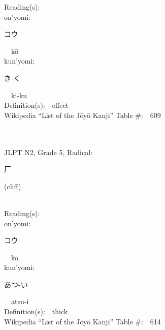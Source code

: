 \begin{multicols}{2}
Reading(s):\ \ \\
{\hspace*{1em}}on'yomi:\ \ \\
{\hspace*{2em}}{\begin{CJK}{UTF8}{min} コウ \end{CJK}}\ \ k\=o\ \ \\
{\hspace*{1em}}kun'yomi:\ \ \\
{\hspace*{2em}}{\begin{CJK}{UTF8}{min} き-く \end{CJK}}\ \ ki-ku\ \ \\
Definition(s):\ \ effect \\
Wikipedia ``List of the J\=oy\=o Kanji'' Table \#:\ \ 609 \\
\ \ \\
{\fontsize{34pt}{40pt}  }\ \ \\  %
{JLPT N2, Grade 5, Radical:\ \ {\begin{CJK}{UTF8}{min} 厂 \end{CJK}} (cliff) } \\
Reading(s):\ \ \\
{\hspace*{1em}}on'yomi:\ \ \\
{\hspace*{2em}}{\begin{CJK}{UTF8}{min} コウ \end{CJK}}\ \ k\=o\ \ \\
{\hspace*{1em}}kun'yomi:\ \ \\
{\hspace*{2em}}{\begin{CJK}{UTF8}{min} あつ-い \end{CJK}}\ \ atsu-i\ \ \\
Definition(s):\ \ thick \\
Wikipedia ``List of the J\=oy\=o Kanji'' Table \#:\ \ 614 \\
\ \ \\
{\fontsize{34pt}{40pt}  }\ \ \\  %

\end{multicols}
